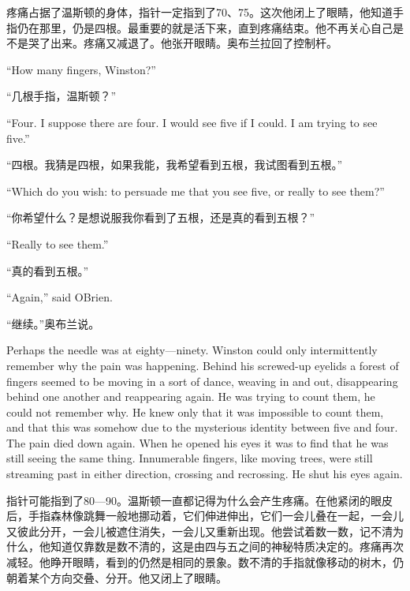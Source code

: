 \begin{paracol}{2}
\switchcolumn

疼痛占据了温斯顿的身体，指针一定指到了70、75。这次他闭上了眼睛，他知道手指仍在那里，仍是四根。最重要的就是活下来，直到疼痛结束。他不再关心自己是不是哭了出来。疼痛又减退了。他张开眼睛。奥布兰拉回了控制杆。

\switchcolumn*

``How many fingers, Winston?''

\switchcolumn

``几根手指，温斯顿？''

\switchcolumn*

``Four. I suppose there are four. I would see five if I could. I am
trying to see five.''

\switchcolumn

``四根。我猜是四根，如果我能，我希望看到五根，我试图看到五根。''

\switchcolumn*

``Which do you wish: to persuade me that you see five, or really to see
them?''

\switchcolumn

``你希望什么？是想说服我你看到了五根，还是真的看到五根？''

\switchcolumn*

``Really to see them.''

\switchcolumn

``真的看到五根。''

\switchcolumn*

``Again,'' said O\textquotesingle Brien.

\switchcolumn

``继续。''奥布兰说。

\switchcolumn*

Perhaps the needle was at eighty---ninety. Winston could only
intermittently remember why the pain was happening. Behind his
screwed-up eyelids a forest of fingers seemed to be moving in a sort of
dance, weaving in and out, disappearing behind one another and
reappearing again. He was trying to count them, he could not remember
why. He knew only that it was impossible to count them, and that this
was somehow due to the mysterious identity between five and four. The
pain died down again. When he opened his eyes it was to find that he was
still seeing the same thing. Innumerable fingers, like moving trees,
were still streaming past in either direction, crossing and recrossing.
He shut his eyes again.

\switchcolumn

指针可能指到了80---90。温斯顿一直都记得为什么会产生疼痛。在他紧闭的眼皮后，手指森林像跳舞一般地挪动着，它们伸进伸出，它们一会儿叠在一起，一会儿又彼此分开，一会儿被遮住消失，一会儿又重新出现。他尝试着数一数，记不清为什么，他知道仅靠数是数不清的，这是由四与五之间的神秘特质决定的。疼痛再次减轻。他睁开眼睛，看到的仍然是相同的景象。数不清的手指就像移动的树木，仍朝着某个方向交叠、分开。他又闭上了眼睛。


\end{paracol}
